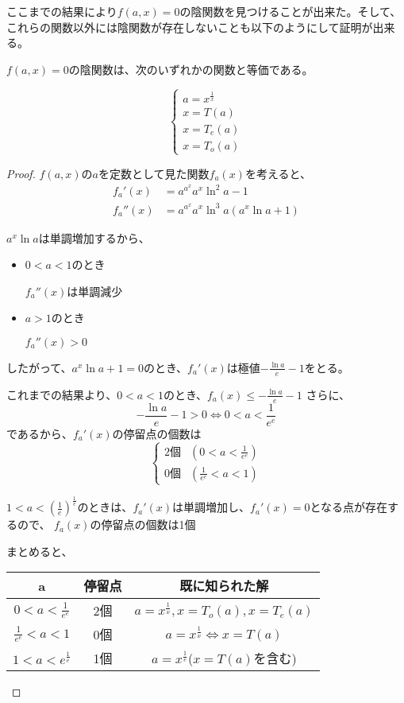 	ここまでの結果により$f(a,x)=0$の陰関数を見つけることが出来た。そして、これらの関数以外には陰関数が存在しないことも以下のようにして証明が出来る。
	\begin{theorem}
	\label{th:all_implicit_function}
		$f(a,x)=0$の陰関数は、次のいずれかの関数と等価である。
		
		\[
		\left \{
			\begin{array}{l}
				a = x^{\frac{1}{x}} \\
				x = T(a) \\
				x = T_e(a) \\
				x = T_o(a)
			\end{array}
		\right.
		\]
	\end{theorem}
	\begin{proof}
	
		$f(a,x)$の$a$を定数として見た関数$f_a(x)$を考えると、
		\begin{align*}
			f_a'(x) &= {a^{a^x}}{a^x}{\ln^2 a} - 1 \\
			f_a''(x)&= {a^{a^x}}{a^x}{\ln^3 a}(a^x\ln a + 1)
		\end{align*}
		
		$a^x\ln a$は単調増加するから、
		
		\begin{itemize}
			\item $0 < a < 1$のとき
			
				$f_a''(x)$は単調減少
			\item $a > 1$のとき
			
				$f_a''(x) > 0$
		\end{itemize}
		
		したがって、$a^x\ln a + 1 = 0$のとき、$f_a'(x)$は極値$-\frac{\ln a}{e} - 1$をとる。
		
		これまでの結果より、$0 < a < 1$のとき、$f_a(x) \leq -\frac{\ln a}{e} - 1$
		さらに、
		\[
			 -\frac{\ln a}{e} - 1 > 0 
			 \iff 0 < a < \frac{1}{e^e}
		\]
		であるから、$f_a'(x)$の停留点の個数は
		\[
			\begin{cases}
				\text{2個} & (0 < a < \frac{1}{e^e}) \\
				\text{0個} & (\frac{1}{e^e} < a < 1)
			\end{cases}
		\]
		
		$1 < a < \left ( \frac{1}{e} \right )^{\frac{1}{e}}$のときは、$f_a'(x)$は単調増加し、$f_a'(x)=0$となる点が存在するので、
		$f_a(x)$の停留点の個数は1個
		
		まとめると、
		\begin{table}[hbtp]
		\begin{center}
		\begin{tabular}{ccc}
			a & 停留点 & 既に知られた解 \\
			\hline
			$0 < a < \frac{1}{e^e}$ & 2個 & $a = x^{\frac{1}{x}},x = T_o(a),x = T_e(a)$ \\
			$\frac{1}{e^e} < a < 1$ & 0個 & $a = x^{\frac{1}{x}} \iff x = T(a)$ \\
			$1 < a < e^{\frac{1}{e}}$ & 1個 & $a = x^{\frac{1}{e}}$($x = T(a)$を含む)
		\end{tabular}
		\end{center}
		\end{table}
		

\end{proof}
